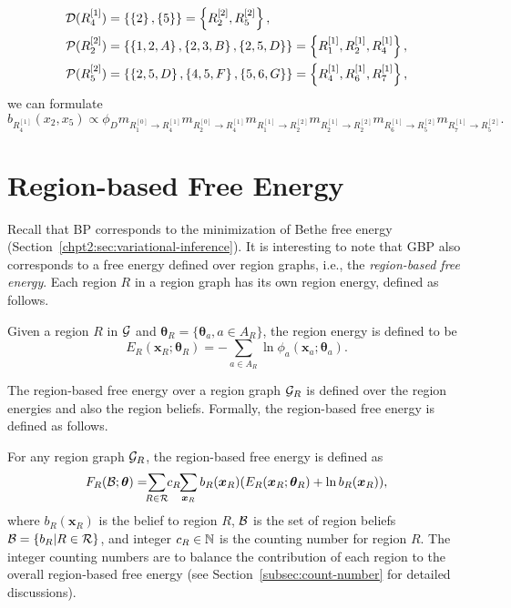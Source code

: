 \begin{example}
\begin{align*}
      \mathcal{D}(R^{[1]}_4)  &= \left\{ \left\{ 2 \right\}, \left\{ 5 \right\} \right\}=\left\{ R^{[2]}_2, R^{[2]}_5 \right\}, \\
      \mathcal{P}(R^{[2]}_2) &= \left\{ \left\{ 1, 2, A \right\}, \left\{ 2, 3, B \right\}, \left\{ 2, 5, D \right\} \right\} = \left\{ R^{[1]}_1, R^{[1]}_2, R^{[1]}_4 \right\}, \\
      \mathcal{P}(R^{[2]}_5) &= \left\{ \left\{ 2, 5, D \right\}, \left\{ 4, 5, F \right\}, \left\{ 5, 6, G \right\} \right\} = \left\{ R^{[1]}_4, R^{[1]}_6, R^{[1]}_7 \right\},
    \end{align*}
    we can formulate
    \begin{equation*}
      b_{R^{[1]}_4}(x_2, x_5) \propto \phi_D m_{R^{[0]}_1\rightarrow R^{[1]}_4} m_{R^{[0]}_2\rightarrow R^{[1]}_4} m_{ R^{[1]}_1\rightarrow R^{[2]}_2 } m_{ R^{[1]}_2\rightarrow R^{[2]}_2 } m_{ R^{[1]}_6 \rightarrow R^{[2]}_5} m_{R^{[1]}_7 \rightarrow R^{[2]}_5}.
      \end{equation*}
\end{example}


\section{Region-based Free Energy}
Recall that BP corresponds to the minimization of Bethe free energy (Section~\ref{chpt2:sec:variational-inference}). It is interesting to note that GBP also corresponds to a free energy defined over region graphs, i.e., the \textit{region-based free energy}.
Each region $R$ in a region graph has its own region energy, defined as follows.
\begin{definition}
  Given a region $R$ in $\mathcal{G}$ and $\bm{\theta}_R=\{\bm{\theta}_a, a\in A_R\}$, the region energy is defined to be
  \begin{equation}
    E_R(\bm{x}_R; \bm{\theta}_R) = - \sum_{a\in A_R} \ln{\phi_a(\bm{x}_a; \bm{\theta}_a)}.
  \end{equation}
\end{definition}
The region-based free energy over a region graph $\mathcal{G}_R$ is defined over the region energies and also the region beliefs. Formally, the region-based free energy is defined as follows.
\begin{definition}\label{def:region-free-energy}
  For any region graph $\mathcal{G}_R$, the region-based free energy is defined as
  \begin{equation}\label{eq:def-region-free-energy}
    F_R(\Bb; \bm{\theta}) = \hspace{-0.15cm}\sum_{R\in \Rr} \hspace{-0.1cm}c_R\hspace{-0.1cm} \sum_{\bm{x}_R}b_R(\bm{x}_R) (E_R(\bm{x}_R; \bm{\theta}_R) + \ln{b_R}(\bm{x}_R)),
  \end{equation}
  where $b_R(\bm{x}_R)$ is the belief to region $R$, $\mathcal{B}$ is the set of region beliefs $\mathcal{B} = \left\{ b_R| R \in \mathcal{R} \right\}$, and integer $c_R \in \mathbb{N}$ is the counting number for region $R$. The integer counting numbers are to balance the contribution of each region to the overall region-based free energy (see Section~\ref{subsec:count-number} for detailed discussions).
\end{definition}

